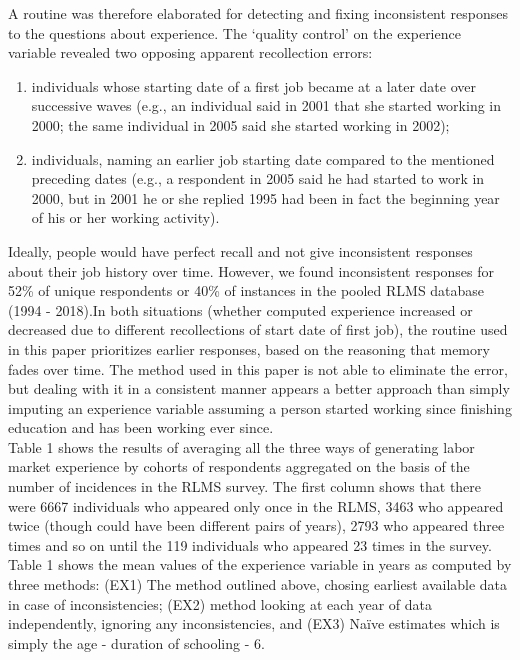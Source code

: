 \documentclass[12pt,a4paper]{article}
\numberwithin{equation}{section}
\begin{document}
A routine was therefore elaborated for detecting and fixing inconsistent responses to the questions about experience. The `quality control' on the experience variable revealed two opposing apparent recollection errors:

\begin{enumerate}
\item individuals whose starting date of a first job became at a later date over successive waves (e.g., an individual said in 2001 that she started working in 2000; the same individual in 2005 said she started working in 2002); 

\item individuals, naming an earlier job starting date compared to the mentioned preceding dates (e.g., a respondent in 2005 said he had started to work in 2000, but in 2001 he or she replied 1995 had been in fact the beginning year of his or her working activity). 
\end{enumerate}

Ideally, people would have perfect recall and not give inconsistent responses about their job history over time. However, we found inconsistent responses for 52\% of unique respondents or 40\% of instances in the pooled RLMS database (1994 - 2018).In both situations (whether computed experience increased or decreased due to different recollections of start date of first job), the  routine used in this paper prioritizes earlier responses, based on the reasoning that memory fades over time.  The method used in this paper is not able to eliminate the error, but dealing with it in a consistent manner appears a better approach than simply imputing an experience variable assuming a person started working since finishing education and has been working ever since.\\



Table 1 shows the results of averaging all the three ways of generating labor market experience by cohorts of respondents aggregated on the basis of the number of incidences in the RLMS survey. The first column shows that there were 6667 individuals who appeared only once in the RLMS, 3463 who appeared twice (though could have been different pairs of years), 2793 who appeared three times and so on until the 119 individuals who appeared 23 times in the survey. Table 1 shows the mean values of the experience variable in years as computed by three methods: (EX1) The method outlined above, chosing earliest available data in case of inconsistencies; (EX2) method looking at each year of data independently, ignoring any inconsistencies, and (EX3) Na\"ive estimates which is simply the age - duration of schooling - 6.\\
\end{document}
